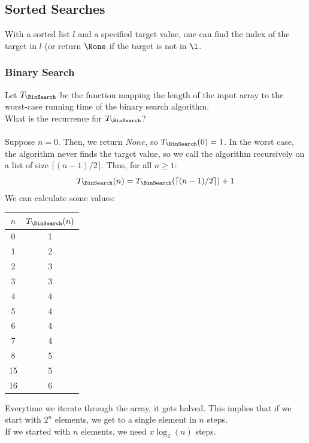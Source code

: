 \documentclass{article}
\begin{document}
\subsection{Sorted Searches}
With a sorted list $l$ and a specified target value, one can find the index of the target in $l$ (or return $\None$ if the target is not in $\l$.
\subsubsection{Binary Search}
Let $T_{\BinSearch}$ be the function mapping the length of the input array to the worst-case running time of the binary search algorithm.\\
What is the recurrence for $T_{\BinSearch}$?\\
\\
Suppose $n = 0$. Then, we return $None$, so $T_{\BinSearch}(0) = 1$. In the worst case, the algorithm never finds the target value, so we call the algorithm recursively on a list of size $\lceil (n - 1)/2 \rceil$. Thus, for all $n \geq 1$:
$$T_{\BinSearch}(n) = T_{\BinSearch}(\lceil (n - 1) / 2\rceil) + 1$$
We can calculate some values:
\begin{center}
    \begin{tabular}{c|c}
         $n$ & $T_{\BinSearch}(n)$ \\
         \hline
         0 & 1\\
         1 & 2\\
         2 & 3\\
         3 & 3\\
         4 & 4\\
         5 & 4\\
         6 & 4\\
         7 & 4\\
         8 & 5\\
         15 & 5\\
         16 & 6
    \end{tabular}
\end{center}
Everytime we iterate through the array, it gets halved. This implies that if we start with $2^n$ elements, we get to a single element in $n$ steps.\\
If we started with $n$ elements, we need $x \log_2(n)$ steps.
\end{document}
